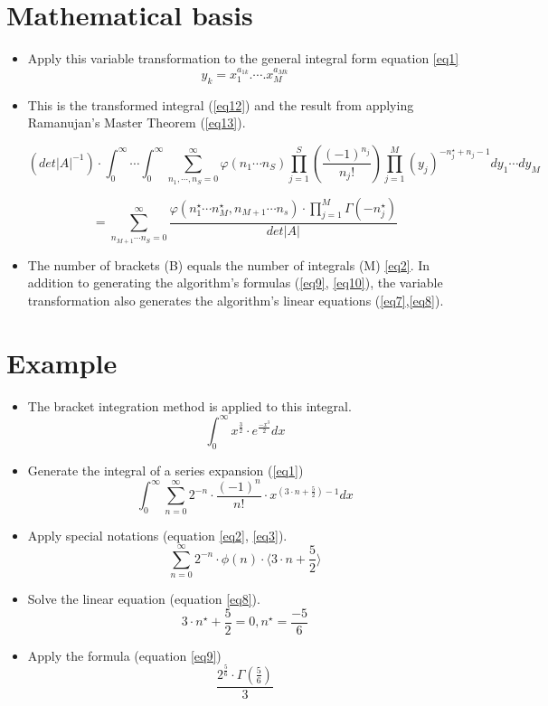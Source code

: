 \documentclass{article}
\begin{document}
\section{Mathematical basis}
\begin{itemize}
    \item Apply this variable transformation to the general integral form equation \ref{eq1}\cite{ramanujan_journal}
    \begin{equation}
    \label{eq11}
    y_k = x_1^{a_{1k}} . \cdots . x_M^{a_{Mk}}
    \end{equation}

    \item This is the transformed integral (\ref{eq12}) and the result from applying Ramanujan's Master Theorem (\ref{eq13}).
    
    \begin{equation}
    \label{eq12}
        (det\vert A \vert^{-1})\cdot\int_0^\infty\cdots\int_0^\infty\sum_{n_1,\cdots,n_S=0}^\infty\varphi(n_1\cdots n_S)\prod_{j=1}^S\left(\frac{(-1)^{n_j}}{n_j !}\right)\prod_{j=1}^M(y_j)^{-n_j^\star+n_j-1}dy_1\cdots dy_M
    \end{equation}

    \begin{equation}
    \label{eq13}
        =\sum_{n_{M+1}\cdots n_S = 0}^\infty \frac{\varphi(n_1^\star\cdots n_M^\star,n_{M+1}\cdots n_s) \cdot \prod_{j=1}^M\Gamma(-n_j^\star)}{det\vert A \vert}
    \end{equation}

    \item The number of brackets (B) equals the number of integrals (M) \ref{eq2}. In addition to generating the algorithm's formulas (\ref{eq9}, \ref{eq10}), the variable transformation also generates the algorithm's linear equations (\ref{eq7},\ref{eq8}).\cite{adv_applied_maths}
    
\end{itemize}

\section{Example}
\begin{itemize}
    \item The bracket integration method is applied to this integral.
    $$\int_0^\infty x^{\frac{3}{2}}\cdot e^{\frac{-x^3}{2}}dx$$
    \item Generate the integral of a series expansion (\ref{eq1})
    $$\int_0^\infty\sum_{n=0}^\infty 2^{-n}\cdot \frac{(-1)^n}{n!}\cdot x^{(3\cdot n + \frac{5}{2})-1} dx$$
    \item Apply special notations (equation \ref{eq2}, \ref{eq3}).
    $$\sum_{n=0}^\infty 2^{-n}\cdot \phi(n)\cdot\langle 3\cdot n + \frac{5}{2}\rangle$$
    \item Solve the linear equation (equation \ref{eq8}).
    $$3\cdot n^\star + \frac{5}{2} = 0, n^\star = \frac{-5}{6}$$
    \item Apply the formula (equation \ref{eq9})
    $$\frac{2^{\frac{5}{6}} \cdot \Gamma (\frac{5}{6})}{3}$$
\end{itemize}





\end{document}

